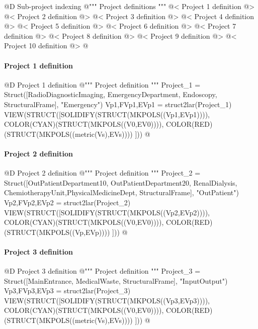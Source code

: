 \documentclass[11pt,oneside]{article}    %
\begin{document}
@D Sub-project indexing
@{""" Project definitions """
@< Project 1 definition @>
@< Project 2 definition @>
@< Project 3 definition @>
@< Project 4 definition @>
@< Project 5 definition @>
@< Project 6 definition @>
@< Project 7 definition @>
@< Project 8 definition @>
@< Project 9 definition @>
@< Project 10 definition @>
@}


\paragraph{Project 1 definition}
@D Project 1 definition
@{""" Project definition """
Project_1 = Struct([RadioDiagnosticImaging, EmergencyDepartment, Endoscopy, 
					StructuralFrame], "Emergency")
Vp1,FVp1,EVp1 = struct2lar(Project_1)
VIEW(STRUCT([SOLIDIFY(STRUCT(MKPOLS((Vp1,EVp1)))), COLOR(CYAN)(STRUCT(MKPOLS((V0,EV0)))),
COLOR(RED)(STRUCT(MKPOLS((metric(Vs),EVs)))) ]))
@}

\paragraph{Project 2 definition}
@D Project 2 definition
@{""" Project definition """
Project_2 = Struct([OutPatientDepartment10, OutPatientDepartment20, RenalDialysis,
					ChemiotherapyUnit,PhysicalMedicineDept, StructuralFrame], "OutPatient")
Vp2,FVp2,EVp2 = struct2lar(Project_2)
VIEW(STRUCT([SOLIDIFY(STRUCT(MKPOLS((Vp2,EVp2)))), COLOR(CYAN)(STRUCT(MKPOLS((V0,EV0)))),
COLOR(RED)(STRUCT(MKPOLS((Vp,EVp)))) ]))
@}

\paragraph{Project 3 definition}
@D Project 3 definition
@{""" Project definition """
Project_3 = Struct([MainEntrance, MedicalWaste, StructuralFrame], "InputOutput")
Vp3,FVp3,EVp3 = struct2lar(Project_3)
VIEW(STRUCT([SOLIDIFY(STRUCT(MKPOLS((Vp3,EVp3)))), COLOR(CYAN)(STRUCT(MKPOLS((V0,EV0)))),
COLOR(RED)(STRUCT(MKPOLS((metric(Vs),EVs)))) ]))
@}
\end{document}
